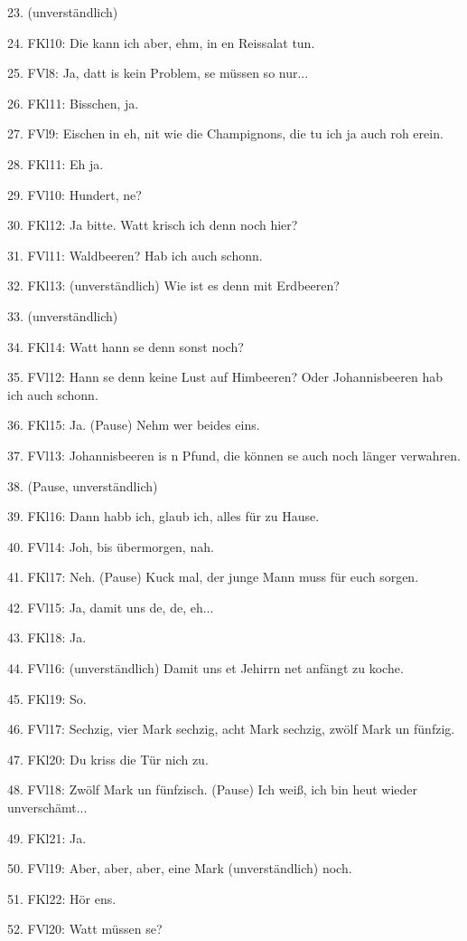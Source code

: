 \documentclass[
]{article}
\begin{document}
23. (unverständlich)

24. FKl10: Die kann ich aber, ehm, in en Reissalat tun.

25. FVl8: Ja, datt is kein Problem, se müssen so nur...

26. FKl11: Bisschen, ja.

27. FVl9: Eischen in eh, nit wie die Champignons, die tu ich ja auch roh erein.

28. FKl11: Eh ja.

29. FVl10: Hundert, ne?

30. FKl12: Ja bitte. Watt krisch ich denn noch hier?

31. FVl11: Waldbeeren? Hab ich auch schonn.

32. FKl13: (unverständlich) Wie ist es denn mit Erdbeeren?

33. (unverständlich)

34. FKl14: Watt hann se denn sonst noch?

35. FVl12: Hann se denn keine Lust auf Himbeeren? Oder Johannisbeeren hab ich auch schonn.

36. FKl15: Ja. (Pause) Nehm wer beides eins.

37. FVl13: Johannisbeeren is \textquotesingle n Pfund, die können se auch noch länger verwahren.

38. (Pause, unverständlich)

39. FKl16: Dann habb ich, glaub ich, alles für zu Hause.

40. FVl14: Joh, bis übermorgen, nah.

41. FKl17: Neh. (Pause) Kuck mal, der junge Mann muss für euch sorgen.

42. FVl15: Ja, damit uns de, de, eh...

43. FKl18: Ja.

44. FVl16: (unverständlich) Damit uns et Jehirrn net anfängt zu koche.

45. FKl19: So.

46. FVl17: Sechzig, vier Mark sechzig, acht Mark sechzig, zwölf Mark un fünfzig.

47. FKl20: Du kriss die Tür nich zu.

48. FVl18: Zwölf Mark un fünfzisch. (Pause) Ich weiß, ich bin heut wieder unverschämt...

49. FKl21: Ja.

50. FVl19: Aber, aber, aber, eine Mark (unverständlich) noch.

51. FKl22: Hör ens.

52. FVl20: Watt müssen se?
\end{document}
